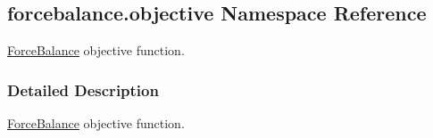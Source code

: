 \hypertarget{namespaceforcebalance_1_1objective}{}\subsection{forcebalance.\+objective Namespace Reference}
\label{namespaceforcebalance_1_1objective}


\hyperlink{namespaceForceBalance}{Force\+Balance} objective function.  




\subsubsection{Detailed Description}
\hyperlink{namespaceForceBalance}{Force\+Balance} objective function. 

